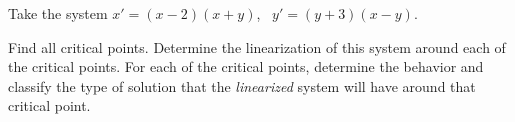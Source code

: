\documentclass{ximera}
\begin{document}
\begin{exercise}
    Take the system $x' = (x-2)(x+y)$, \ $y' = (y+3)(x-y)$.
    \begin{tasks}
        \task Find all critical points.
        \task Determine the linearization of this system around each of the critical points.
        \task For each of the critical points, determine the behavior and classify the type of solution that the  \emph{linearized} system will have around that critical point. 
    \end{tasks}
\end{exercise}
\end{document}
